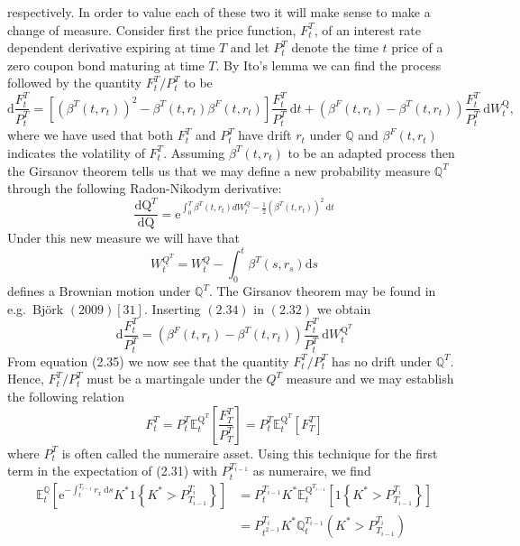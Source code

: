 \documentclass[12pt,twoside]{reedthesis}
\begin{document}
respectively. In order to value each of these two it will make sense to make a change of measure. Consider first the price function, \(F_{t}^{T}\), of an interest rate dependent derivative expiring at time \(T\) and let \(P_{t}^{T}\) denote the time \(t\) price of a zero coupon bond maturing at time \(T\). By Ito's lemma we can find the process followed by the quantity \(F_{t}^{T} / P_{t}^{T}\) to be
\[
\mathrm{d} \frac{F_{t}^{T}}{P_{t}^{T}}=\left[\left(\beta^{T}\left(t, r_{t}\right)\right)^{2}-\beta^{T}\left(t, r_{t}\right) \beta^{F}\left(t, r_{t}\right)\right] \frac{F_{t}^{T}}{P_{t}^{T}} \mathrm{~d} t+\left(\beta^{F}\left(t, r_{t}\right)-\beta^{T}\left(t, r_{t}\right)\right) \frac{F_{t}^{T}}{P_{t}^{T}} \mathrm{~d} W_{t}^{\mathrm{Q}},
\]
where we have used that both \(F_{t}^{T}\) and \(P_{t}^{T}\) have drift \(r_{t}\) under \(\mathbb{Q}\) and \(\beta^{F}\left(t, r_{t}\right)\) indicates the volatility of \(F_{t}^{T}\). Assuming \(\beta^{T}\left(t, r_{t}\right)\) to be an adapted process then the Girsanov theorem tells us that we may define a new probability measure \(\mathbb{Q}^{T}\) through the following Radon-Nikodym derivative:
\[
\frac{\mathrm{dQ}^{T}}{\mathrm{dQ}}=\mathrm{e}^{\int_{0}^{T} \beta^{T}\left(t, r_{t}\right) d W_{t}^{Q}-\frac{1}{2}\left(\beta^{T}\left(t, r_{t}\right)\right)^{2} \mathrm{~d} t}
\]
Under this new measure we will have that
\[
W_{t}^{Q^{T}}=W_{t}^{Q}-\int_{0}^{t} \beta^{T}\left(s, r_{s}\right) \mathrm{d} s
\]
defines a Brownian motion under \(\mathbb{Q}^{T}\). The Girsanov theorem may be found in e.g.~Björk \((2009)[31]\). Inserting \((2.34)\) in \((2.32)\) we obtain
\[
\mathrm{d} \frac{F_{t}^{T}}{P_{t}^{T}}=\left(\beta^{F}\left(t, r_{t}\right)-\beta^{T}\left(t, r_{t}\right)\right) \frac{F_{t}^{T}}{P_{t}^{T}} \mathrm{~d} W_{t}^{\mathrm{Q}^{T}}
\]
From equation (2.35) we now see that the quantity \(F_{t}^{T} / P_{t}^{T}\) has no drift under \(\mathbb{Q}^{T}\). Hence, \(F_{t}^{T} / P_{t}^{T}\) must be a martingale under the \(Q^{T}\) measure and we may establish the following relation
\[
F_{t}^{T}=P_{t}^{T} \mathbb{E}_{t}^{\mathrm{Q}^{T}}\left[\frac{F_{T}^{T}}{P_{T}^{T}}\right]=P_{t}^{T} \mathbb{E}_{t}^{\mathrm{Q}^{T}}\left[F_{T}^{T}\right]
\]
where \(P_{t}^{T}\) is often called the numeraire asset. Using this technique for the first term in the expectation of (2.31) with \(P_{t}^{T_{i-1}}\) as numeraire, we find
\[
\begin{aligned}
\mathbb{E}_{t}^{\mathbb{Q}}\left[\mathrm{e}^{-\int_{t}^{T_{i-1}} r_{x} \mathrm{~d} s} K^{*} 1\left\{K^{*}>P_{T_{i-1}}^{T_{i}}\right\}\right] &=P_{t}^{T_{i-1}} K^{*} \mathbb{E}_{t}^{\mathrm{Q}^{T_{i-1}}}\left[1\left\{K^{*}>P_{T_{i-1}}^{T_{i}}\right\}\right] \\
&=P_{t^{2-1}}^{T_{i}} K^{*} \mathbb{Q}_{t}^{T_{i-1}}\left(K^{*}>P_{T_{i-1}}^{T_{i}}\right)
\end{aligned}
\]
\end{document}
